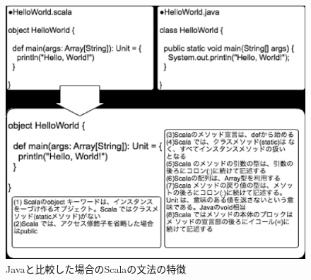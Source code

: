 \begin{figure}[h]
  \centering
  \caption{Javaと比較した場合のScalaの文法の特徴}
  \label{fig:java_vs_scala_helloworld}
  \includegraphics[scale=0.8]{img/hello_world_code.eps}
\end{figure}
